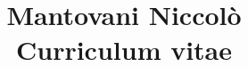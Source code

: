 \documentclass[a4paper,11pt]{article}
\begin{document}
	\title{%
		Mantovani Niccolò \\
		\large Curriculum vitae}
	\date{}
	\maketitle
	
	
	\vspace{5mm}
	
	\vspace{5mm}
	
	\newpage
	
	\vspace{5mm}
	
\end{document}
